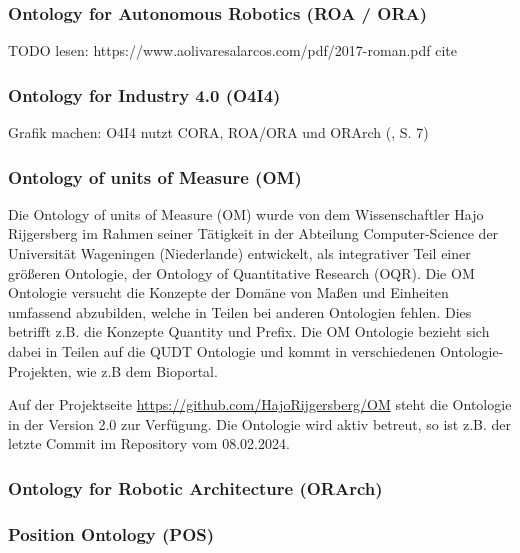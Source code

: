 \documentclass{article}
\begin{document}
\subsubsection{Ontology for Autonomous Robotics (ROA / ORA)}

TODO lesen: https://www.aolivaresalarcos.com/pdf/2017-roman.pdf
cite \cite{olszewska2017ontology}

\subsubsection{Ontology for Industry 4.0 (O4I4)}

\cite{kumar2019ontologies}

Grafik machen: O4I4 nutzt CORA, ROA/ORA und ORArch (\cite{kumar2019ontologies}, S. 7)

\subsubsection{Ontology of units of Measure (OM)}

Die Ontology of units of Measure (OM) wurde von dem Wissenschaftler Hajo Rijgersberg im Rahmen seiner Tätigkeit in der Abteilung Computer-Science der Universität Wageningen (Niederlande) entwickelt, als integrativer Teil einer größeren Ontologie\cite{rijgersberg2013ontology}, der Ontology of Quantitative Research (OQR).
Die OM Ontologie versucht die Konzepte der Domäne von Maßen und Einheiten umfassend abzubilden, welche in Teilen bei anderen Ontologien fehlen. Dies betrifft z.B. die Konzepte Quantity und Prefix. Die OM Ontologie bezieht sich dabei in Teilen auf die QUDT Ontologie und kommt in verschiedenen Ontologie-Projekten, wie z.B dem Bioportal\cite{OM_BioPortal}.

Auf der Projektseite \url{https://github.com/HajoRijgersberg/OM} steht die Ontologie in der Version 2.0 zur Verfügung. Die Ontologie wird aktiv betreut, so ist z.B. der letzte Commit im Repository vom 08.02.2024.

\subsubsection{Ontology for Robotic Architecture (ORArch)}

\cite{kumar2019ontologies}

\subsubsection{Position Ontology (POS)}
\end{document}
